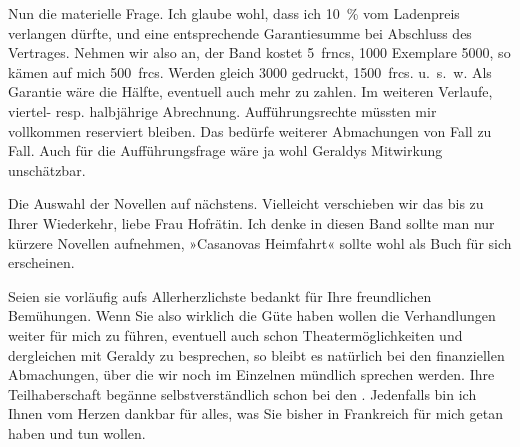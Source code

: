 \pstart
           Nun die materielle Frage. Ich glaube wohl, dass ich 10 {\%} vom
               Ladenpreis verlangen dürfte, und eine entsprechende Garantiesumme bei Abschluss des
               Vertrages. Nehmen wir also an, der Band kostet 5 frncs, 1000 Exemplare 5000, so kämen
               auf mich 500 frcs. Werden gleich 3000 gedruckt, 1500 frcs. u. s. w. Als Garantie wäre
               die Hälfte, eventuell auch mehr zu zahlen. Im weiteren Verlaufe, viertel- resp.
               halbjährige Abrechnung. Aufführungsrechte müssten mir vollkommen reserviert bleiben.
               Das bedürfe weiterer Abmachungen von Fall zu Fall. Auch für die Aufführungsfrage wäre
               ja wohl Geraldys Mitwirkung unschätzbar.\pend
           
\pstart
           Die Auswahl der Novellen auf nächstens. Vielleicht verschieben wir das bis zu Ihrer
               Wiederkehr, liebe Frau Hofrätin. Ich denke in diesen Band sollte man nur kürzere
               Novellen aufnehmen, »Casanovas Heimfahrt« sollte
               wohl als Buch für sich erscheinen.\pend
           
\pstart
           Seien sie vorläufig aufs Allerherzlichste bedankt für Ihre freundlichen Bemühungen.
               Wenn Sie also wirklich die Güte haben wollen die Verhandlungen weiter für mich zu
               führen, eventuell auch schon Theatermöglichkeiten und dergleichen mit Geraldy zu besprechen, so bleibt es natürlich
               bei den finanziellen Abmachungen, über die wir noch im Einzelnen mündlich sprechen
               werden. Ihre Teilhaberschaft begänne selbstverständlich schon bei den \label{K_L03947-4v}\label{K_L03947-4}. Jedenfalls bin ich Ihnen vom Herzen dankbar für alles, was Sie
               bisher in Frankreich für mich getan haben und tun
               wollen.\pend
           \endnumbering{}
\begin{anhang}
\end{anhang}\newcommand{\dateiname}{L03947}\newcommand{\titel}{Arthur Schnitzler an Berta Zuckerkandl, 25. 10. 1923}\newcommand{\editorInnen}{Herausgegeben von Jahnke, SelmaMüller, Martin Anton}
